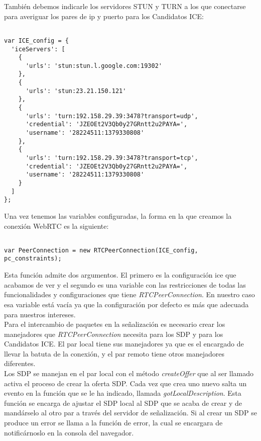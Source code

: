 También debemos indicarle los servidores STUN y TURN a los que conectarse para averiguar los pares de ip y puerto para los Candidatos ICE:\\

\begin{lstlisting}[caption=Servidores STUN y TURN]

var ICE_config = {
  'iceServers': [
    {
      'urls': 'stun:stun.l.google.com:19302'
    },
    {
      'urls': 'stun:23.21.150.121'
    },
    {
      'urls': 'turn:192.158.29.39:3478?transport=udp',
      'credential': 'JZEOEt2V3Qb0y27GRntt2u2PAYA=',
      'username': '28224511:1379330808'
    },
    {
      'urls': 'turn:192.158.29.39:3478?transport=tcp',
      'credential': 'JZEOEt2V3Qb0y27GRntt2u2PAYA=',
      'username': '28224511:1379330808'
    }
  ]
};

\end{lstlisting}

Una vez tenemos las variables configuradas, la forma en la que creamos la conexión WebRTC es la siguiente:\\

\begin{lstlisting}[caption=RTCPeerConnection.]

var PeerConnection = new RTCPeerConnection(ICE_config, pc_constraints);

\end{lstlisting}

Esta función admite dos argumentos. El primero es la configuración ice que acabamos de ver y el segundo es una variable con las restricciones de todas las funcionalidades y configuraciones que tiene \emph{RTCPeerConnection}. En nuestro caso esa variable está vacía ya que la configuración por defecto es más que adecuada para nuestros intereses.\\

Para el intercambio de paquetes en la señalización es necesario crear los manejadores que \emph{RTCPeerConnection} necesita para los SDP y para los Candidatos ICE. El par local tiene sus manejadores ya que es el encargado de llevar la batuta de la conexión, y el par remoto tiene otros manejadores diferentes. \\

Los SDP se manejan en el par local con el método \emph{createOffer} que al ser llamado activa el proceso de crear la oferta SDP. Cada vez que crea uno nuevo salta un evento en la función que se le ha indicado, llamada \emph{gotLocalDescription}. Esta función se encarga de ajustar el SDP local al SDP que se acaba de crear y de mandárselo al otro par a través del servidor de señalización. Si al crear un SDP se produce un error se llama a la función de error, la cual se encargara de notificárnoslo en la consola del navegador.\\


